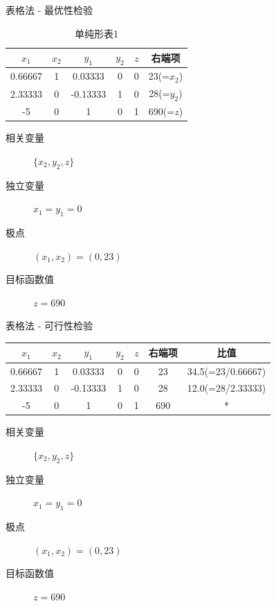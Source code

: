 \documentclass[UTF8]{ctexbeamer}
\begin{document}
\begin{frame}{表格法 - 最优性检验}

  \begin{table}
    \centering
    \begin{tabular}{|ccccc|c|}
      \hline
      {\color{red}$x_1$} & $x_2$ & $y_1$ & $y_2$ & $z$ & 右端项 \\
      \hline
      0.66667 & 1 & 0.03333 & 0 & 0 & 23(=$x_2$)\\
      2.33333 & 0 & -0.13333 & 1 & 0 & 28(=$y_2$)\\
      \hline
      {\color{red}-5} & 0 & 1 & 0 & 1 & 690(=$z$)\\
      \hline
    \end{tabular}
    \caption{单纯形表1}
  \end{table}

  \begin{description}
  \item[相关变量] $\{x_2, y_2, z\}$
  \item[独立变量] $x_1=y_1=0$
  \item[极点] $(x_1, x_2) = (0, 23)$
  \item[目标函数值] $z = 690$
  \end{description}

\end{frame}

\begin{frame}{表格法 - 可行性检验}

  \begin{table}
    \centering
    \begin{tabular}{|ccccc|c|c|}
      \hline
      {\color{red}$x_1$} & $x_2$ & $y_1$ & $y_2$ & $z$ & 右端项 & 比值\\
      \hline
      0.66667 & 1 & 0.03333 & 0 & 0 & 23 & 34.5(=23/0.66667)\\
      2.33333 & 0 & -0.13333 & 1 & 0 & 28 & {\color{green}12.0(=28/2.33333)}\\
      \hline
      {\color{red}-5} & 0 & 1 & 0 & 1 & 690 & *\\
      \hline
    \end{tabular}
  \end{table}

  \begin{description}
  \item[相关变量] $\{x_2, y_2, z\}$
  \item[独立变量] $x_1=y_1=0$
  \item[极点] $(x_1, x_2) = (0, 23)$
  \item[目标函数值] $z = 690$
  \end{description}

\end{frame}
\end{document}
